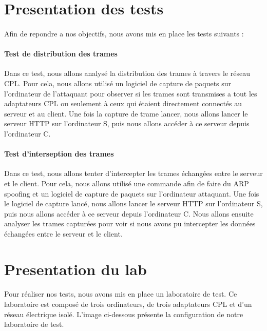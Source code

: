 \documentclass[a4paper,twocolumn]{report}
\begin{document}
\section{Presentation des tests}
\paragraph{}Afin de repondre a nos objectifs, nous avons mis en place les tests suivants :
\paragraph{Test de distribution des trames} Dans ce test, nous allons analysé la distribution des trames à travers le réseau CPL. Pour cela, nous allons utilisé un logiciel de capture de paquets sur l'ordinateur de l'attaquant pour observer si les trames sont transmises a tout les adaptateurs CPL ou seulement à ceux qui étaient directement connectés au serveur et au client. Une fois la capture de trame lancer, nous allons lancer le serveur HTTP sur l'ordinateur S, puis nous allons accéder à ce serveur depuis l'ordinateur C. 

\paragraph{Test d'interseption des trames} Dans ce test, nous allons tenter d'intercepter les trames échangées entre le serveur et le client. Pour cela, nous allons utilisé une commande afin de faire du ARP spoofing et un logiciel de capture de paquets sur l'ordinateur attaquant. Une fois le logiciel de capture lancé, nous allons lancer le serveur HTTP sur l'ordinateur S, puis nous allons accéder à ce serveur depuis l'ordinateur C. Nous allons ensuite analyser les trames capturées pour voir si nous avons pu intercepter les données échangées entre le serveur et le client.

\section{Presentation du lab}
\paragraph{}Pour réaliser nos tests, nous avons mis en place un laboratoire de test. Ce laboratoire est composé de trois ordinateurs, de trois adaptateurs CPL et d'un réseau électrique isolé. L'image ci-dessous présente la configuration de notre laboratoire de test.
\end{document}
